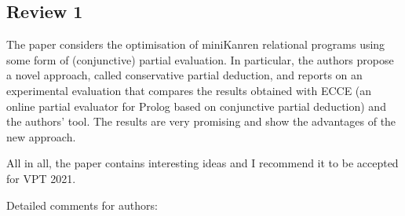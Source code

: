 
\subsection*{Review 1}

The paper considers the optimisation of miniKanren relational programs using some form of (conjunctive) partial evaluation. In particular, the authors propose a novel approach, called conservative partial deduction, and reports on an experimental evaluation that compares the results obtained with ECCE (an online partial evaluator for Prolog based on conjunctive partial deduction) and the authors' tool. The results are very promising and show the advantages of the new approach.

All in all, the paper contains interesting ideas and I recommend it to be accepted for VPT 2021.


Detailed comments for authors:

